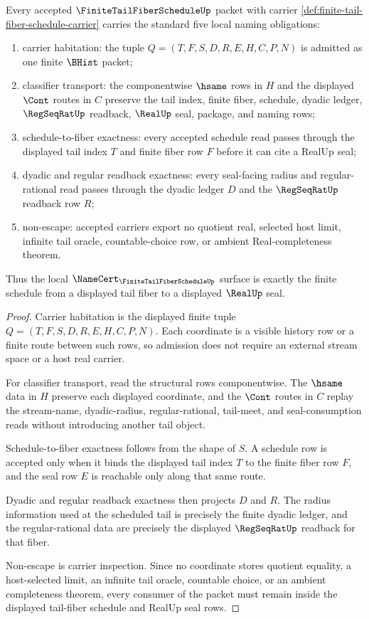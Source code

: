 \begin{theorem}
\label{thm:finite-tail-fiber-schedule-namecert-obligations}
Every accepted $\FiniteTailFiberScheduleUp$ packet with carrier \autoref{def:finite-tail-fiber-schedule-carrier} carries the standard five local naming obligations:
\begin{enumerate}
\item carrier habitation: the tuple $Q=(T,F,S,D,R,E,H,C,P,N)$ is admitted as one finite $\BHist$ packet;
\item classifier transport: the componentwise $\hsame$ rows in $H$ and the displayed $\Cont$ routes in $C$ preserve the tail index, finite fiber, schedule, dyadic ledger, $\RegSeqRatUp$ readback, $\RealUp$ seal, package, and naming rows;
\item schedule-to-fiber exactness: every accepted schedule read passes through the displayed tail index $T$ and finite fiber row $F$ before it can cite a RealUp seal;
\item dyadic and regular readback exactness: every seal-facing radius and regular-rational read passes through the dyadic ledger $D$ and the $\RegSeqRatUp$ readback row $R$;
\item non-escape: accepted carriers export no quotient real, selected host limit, infinite tail oracle, countable-choice row, or ambient Real-completeness theorem.
\end{enumerate}
Thus the local $\NameCert_{\FiniteTailFiberScheduleUp}$ surface is exactly the finite schedule from a displayed tail fiber to a displayed $\RealUp$ seal.
\end{theorem}
\begin{proof}
Carrier habitation is the displayed finite tuple $Q=(T,F,S,D,R,E,H,C,P,N)$. Each coordinate is a visible history row or a finite route between such rows, so admission does not require an external stream space or a host real carrier.

For classifier transport, read the structural rows componentwise. The $\hsame$ data in $H$ preserve each displayed coordinate, and the $\Cont$ routes in $C$ replay the stream-name, dyadic-radius, regular-rational, tail-meet, and seal-consumption reads without introducing another tail object.

Schedule-to-fiber exactness follows from the shape of $S$. A schedule row is accepted only when it binds the displayed tail index $T$ to the finite fiber row $F$, and the seal row $E$ is reachable only along that same route.

Dyadic and regular readback exactness then projects $D$ and $R$. The radius information used at the scheduled tail is precisely the finite dyadic ledger, and the regular-rational data are precisely the displayed $\RegSeqRatUp$ readback for that fiber.

Non-escape is carrier inspection. Since no coordinate stores quotient equality, a host-selected limit, an infinite tail oracle, countable choice, or an ambient completeness theorem, every consumer of the packet must remain inside the displayed tail-fiber schedule and RealUp seal rows.
\end{proof}

